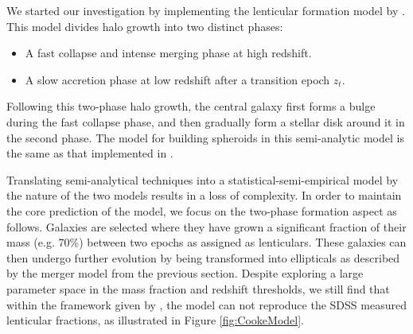 We started our investigation by implementing the lenticular formation model by \citet{Cook2009Two-phaseFormation}. This model divides halo growth into two distinct phases: \begin{itemize}
    \item A fast collapse and intense merging phase at high redshift.
    \item A slow accretion phase at low redshift after a transition epoch $z_{t}$.
\end{itemize}
Following this two-phase halo growth, the central galaxy first forms a bulge during the fast collapse phase, and then gradually form a stellar disk around it in the second phase. The model for building spheroids in this semi-analytic model is the same as that implemented in \citet{Granato2004AHosts}. 

Translating semi-analytical techniques into a statistical-semi-empirical model by the nature of the two models results in a loss of complexity. In order to maintain the core prediction of the \citet{Cook2009Two-phaseFormation} model, we focus on the two-phase formation aspect as follows. Galaxies are selected where they have grown a significant fraction of their mass (e.g. 70\%) between two epochs as assigned as lenticulars. These galaxies can then undergo further evolution by being transformed into ellipticals as described by the merger model from the previous section. Despite exploring a large parameter space in the mass fraction and redshift thresholds, we still find that within the framework given by \steel, the \citet{Cook2009Two-phaseFormation} model can not reproduce the SDSS measured lenticular fractions, as illustrated in Figure \ref{fig:CookeModel}.

